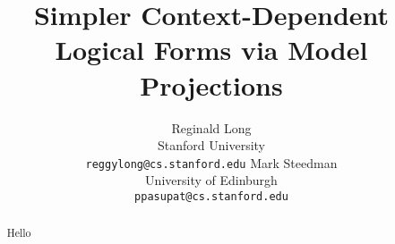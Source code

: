 \documentclass[11pt]{article}
\title{Simpler Context-Dependent Logical Forms via Model Projections}
\author{
  Reginald Long \\
  Stanford University \\
  {\small \tt{reggylong@cs.stanford.edu}}
\And
  Mark Steedman \\
  University of Edinburgh \\
  {\small \tt{ppasupat@cs.stanford.edu}}
}
\date{}
\begin{document}
\maketitle

\begin{abstract}
  Hello
\end{abstract}


%
%




\end{document}
